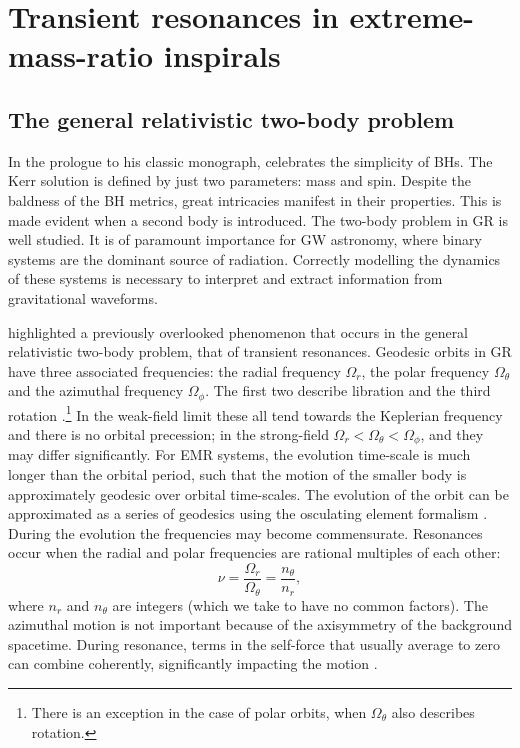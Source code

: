 \chapter{Transient resonances in extreme-mass-ratio inspirals}\label{ch:resonances}

\section{The general relativistic two-body problem}

In the prologue to his classic monograph, \citet{Chandrasekhar1992} celebrates the simplicity of BHs. The Kerr solution is defined by just two parameters: mass and spin. Despite the baldness of the BH metrics, great intricacies manifest in their properties. This is made evident when a second body is introduced. The two-body problem in GR is well studied. It is of paramount importance for GW astronomy, where binary systems are the dominant source of radiation. Correctly modelling the dynamics of these systems is necessary to interpret and extract information from gravitational waveforms.

\citet{Flanagan2012} highlighted a previously overlooked phenomenon that occurs in the general relativistic two-body problem, that of transient resonances. Geodesic orbits in GR have three associated frequencies: the radial frequency $\Omega_r$, the polar frequency $\Omega_\theta$ and the azimuthal frequency $\Omega_\phi$. The first two describe libration and the third rotation \citep[section 10.6]{Goldstein2002}.\footnote{There is an exception in the case of polar orbits, when $\Omega_\theta$ also describes rotation.} In the weak-field limit these all tend towards the Keplerian frequency and there is no orbital precession; in the strong-field $\Omega_r < \Omega_\theta < \Omega_\phi$, and they may differ significantly. For EMR systems, the evolution time-scale is much longer than the orbital period, such that the motion of the smaller body is approximately geodesic over orbital time-scales. The evolution of the orbit can be approximated as a series of geodesics using the osculating element formalism \citep{Pound2008,Gair2011a}. During the evolution the frequencies may become commensurate. Resonances occur when the radial and polar frequencies are rational multiples of each other:
\begin{equation}
\nu = \dfrac{\Omega_r}{\Omega_\theta} = \dfrac{n_\theta}{n_r},
\end{equation}
where $n_r$ and $n_\theta$ are integers (which we take to have no common factors). The azimuthal motion is not important because of the axisymmetry of the background spacetime. During resonance, terms in the self-force that usually average to zero can combine coherently, significantly impacting the motion \citep{Flanagan2012a}.

